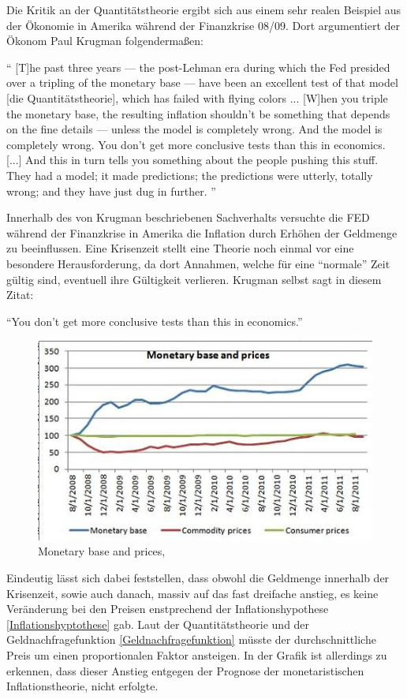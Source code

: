 Die Kritik an der Quantitätstheorie ergibt sich aus einem sehr realen Beispiel aus der Ökonomie in Amerika während der Finanzkrise 08/09. Dort argumentiert der Ökonom Paul Krugman folgendermaßen:

\enquote{
[T]he past three years — the post-Lehman era during which the Fed presided over a tripling of the monetary base — have been an excellent test of that model [die Quantitätstheorie], which has failed with flying colors ... [W]hen you triple the monetary base, the resulting inflation shouldn’t be something that depends on the fine details — unless the model is completely wrong. And the model is completely wrong. You don’t get more conclusive tests than this in economics. [...] And this in turn tells you something about the people pushing this stuff. They had a model; it made predictions; the predictions were utterly, totally wrong; and they have just dug in further.
}\autocite{Krugman2011} 

Innerhalb des von Krugman beschriebenen Sachverhalts versuchte die FED während der Finanzkrise in Amerika die Inflation durch Erhöhen der Geldmenge zu beeinflussen. Eine Krisenzeit stellt eine Theorie noch einmal vor eine besondere Herausforderung, da dort Annahmen, welche für eine \enquote{normale} Zeit gültig sind, eventuell ihre Gültigkeit verlieren. Krugman selbst sagt in diesem Zitat:
\begin{center}
    \enquote{You don’t get more conclusive tests than this in economics.}
\end{center}


\begin{figure}[H]
    \centering
    \includegraphics{img/100711krugman3-blog480.jpg}
    \caption{Monetary base and prices, \cite{Krugman2011}}
\end{figure}    

Eindeutig lässt sich dabei feststellen, dass obwohl die Geldmenge innerhalb der Krisenzeit, sowie auch danach, massiv auf das fast dreifache anstieg, es keine Veränderung bei den Preisen enstprechend der Inflationshypothese \vref{Inflationshyptothese} gab. Laut der Quantitätstheorie und der Geldnachfragefunktion \vref{Geldnachfragefunktion} müsste der durchschnittliche Preis um einen proportionalen Faktor ansteigen. In der Grafik ist allerdings zu erkennen, dass dieser Anstieg entgegen der Prognose der monetaristischen Inflationstheorie, nicht erfolgte.
